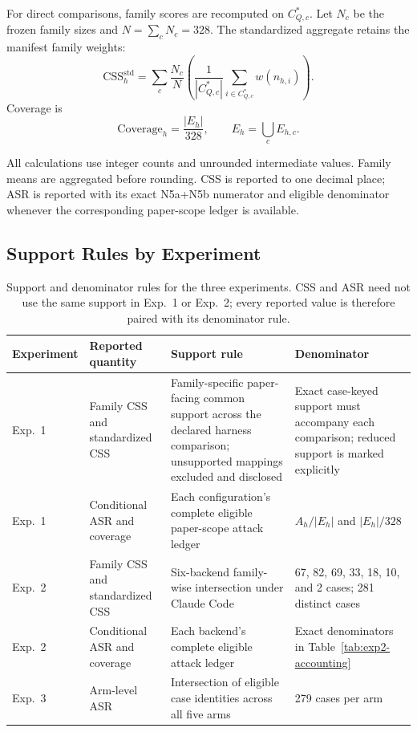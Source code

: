 \documentclass[letterpaper]{article}
\begin{document}
For direct comparisons, family scores are recomputed on
\(C_{Q,c}^{*}\).  Let \(N_c\) be the frozen family sizes and
\(N=\sum_c N_c=328\).  The standardized aggregate retains the manifest family
weights:
\begin{equation}
\mathrm{CSS}^{\mathrm{std}}_h
=\sum_c\frac{N_c}{N}
\left(
\frac{1}{|C_{Q,c}^{*}|}
\sum_{i\in C_{Q,c}^{*}}w(n_{h,i})
\right).
\label{eq:css-standardized}
\end{equation}
Coverage is
\begin{equation}
\mathrm{Coverage}_h=\frac{|E_h|}{328},
\qquad E_h=\bigcup_cE_{h,c}.
\label{eq:coverage}
\end{equation}

All calculations use integer counts and unrounded intermediate values.
Family means are aggregated before rounding.  CSS is reported to one decimal
place; ASR is reported with its exact N5a+N5b numerator and eligible
denominator whenever the corresponding paper-scope ledger is available.

\subsection{Support Rules by Experiment}
\label{app:support-rules}

\begin{table}[t]
\centering
\small
\setlength{\tabcolsep}{4pt}
\begin{tabularx}{\textwidth}{@{}p{}p{}p{}X@{}}
\toprule
Experiment & Reported quantity & Support rule & Denominator \\
\midrule
Exp.~1 & Family CSS and standardized CSS &
Family-specific paper-facing common support across the declared harness
comparison; unsupported mappings excluded and disclosed &
Exact case-keyed support must accompany each comparison; reduced support is
marked explicitly \\
Exp.~1 & Conditional ASR and coverage &
Each configuration's complete eligible paper-scope attack ledger &
\(A_h/|E_h|\) and \(|E_h|/328\) \\
Exp.~2 & Family CSS and standardized CSS &
Six-backend family-wise intersection under Claude Code &
67, 82, 69, 33, 18, 10, and 2 cases; 281 distinct cases \\
Exp.~2 & Conditional ASR and coverage &
Each backend's complete eligible attack ledger &
Exact denominators in Table~\ref{tab:exp2-accounting} \\
Exp.~3 & Arm-level ASR &
Intersection of eligible case identities across all five arms &
279 cases per arm \\
\bottomrule
\end{tabularx}
\caption{Support and denominator rules for the three experiments.  CSS and ASR
need not use the same support in Exp.~1 or Exp.~2; every reported value is
therefore paired with its denominator rule.}
\label{tab:support-rules}
\end{table}
\end{document}
